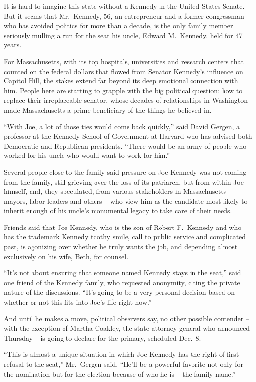﻿\documentclass[12pt]{article}
\begin{document}
It is hard to imagine this state without a Kennedy in the United States Senate. But it seems that
Mr.~Kennedy, 56, an entrepreneur and a former congressman who has avoided politics for more than a
decade, is the only family member seriously mulling a run for the seat his uncle, Edward M.~Kennedy,
held for 47 years.

For Massachusetts, with its top hospitals, universities and research centers that counted on the
federal dollars that flowed from Senator Kennedy's influence on Capitol Hill, the stakes extend far
beyond its deep emotional connection with him. People here are starting to grapple with the big
political question: how to replace their irreplaceable senator, whose decades of relationships in
Washington made Massachusetts a prime beneficiary of the things he believed in.

``With Joe, a lot of those ties would come back quickly,'' said David Gergen, a professor at the
Kennedy School of Government at Harvard who has advised both Democratic and Republican presidents.
``There would be an army of people who worked for his uncle who would want to work for him.''

Several people close to the family said pressure on Joe Kennedy was not coming from the family,
still grieving over the loss of its patriarch, but from within Joe himself, and, they speculated,
from various stakeholders in Massachusetts -- mayors, labor leaders and others -- who view him as
the candidate most likely to inherit enough of his uncle's monumental legacy to take care of their
needs.

Friends said that Joe Kennedy, who is the son of Robert F.~Kennedy and who has the trademark Kennedy
toothy smile, call to public service and complicated past, is agonizing\cite{agonizing} over whether
he truly wants the job, and depending almost exclusively on his wife, Beth, for counsel.

``It's not about ensuring that someone named Kennedy stays in the seat,'' said one friend of the
Kennedy family, who requested anonymity, citing the private nature of the discussions. ``It's going
to be a very personal decision based on whether or not this fits into Joe's life right now.''

And until he makes a move, political observers say, no other possible contender -- with the
exception of Martha Coakley, the state attorney general who announced Thursday -- is going to
declare for the primary, scheduled Dec.~8.

``This is almost a unique situation in which Joe Kennedy has the right of first refusal to the
seat,'' Mr.~Gergen said. ``He'll be a powerful favorite not only for the nomination but for the
election because of who he is -- the family name.''
\end{document}
